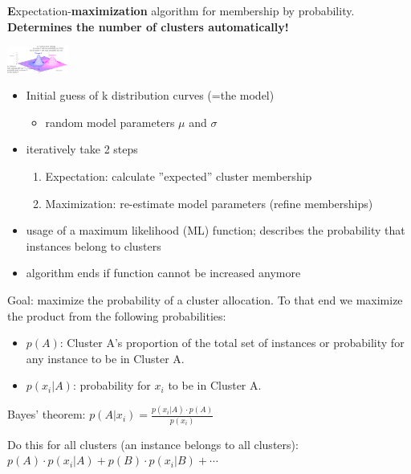 \begin{breakbox}

\textbf{E}xpectation-\textbf{maximization} algorithm for membership by probability. \textbf{Determines the number of clusters automatically!}

\begin{center}
	\includegraphics[width=0.15\textwidth]{slides_images/membership_by_probability_em}
\end{center}

\begin{itemize}
	\item Initial guess of k distribution curves (=the model)
		\begin{itemize}
			\item random model parameters $\mu$ and $\sigma$
		\end{itemize}
	\item iteratively take 2 steps
		\begin{enumerate}
			\item Expectation: calculate ''expected'' cluster membership
			\item Maximization: re-estimate model parameters (refine memberships)
		\end{enumerate}
	\item usage of a maximum likelihood (ML) function; describes the probability that instances belong to clusters
	\item algorithm ends if function cannot be increased anymore
\end{itemize}

Goal: maximize the probability of a cluster allocation. To that end we maximize the product from the following probabilities:
\begin{itemize}
	\item $p(A)$: Cluster A's proportion of the total set of instances or probability for any instance to be in Cluster A.
	\item $p(x_i|A)$: probability for $x_i$ to be in Cluster A.
\end{itemize}

Bayes' theorem: $p(A|x_i) = \frac{p(x_i|A) \cdot p(A)}{p(x_i)}$

Do this for all clusters (an instance belongs to all clusters): $p(A) \cdot p(x_i|A) + p(B) \cdot p(x_i|B) + \cdots$


\end{breakbox}
